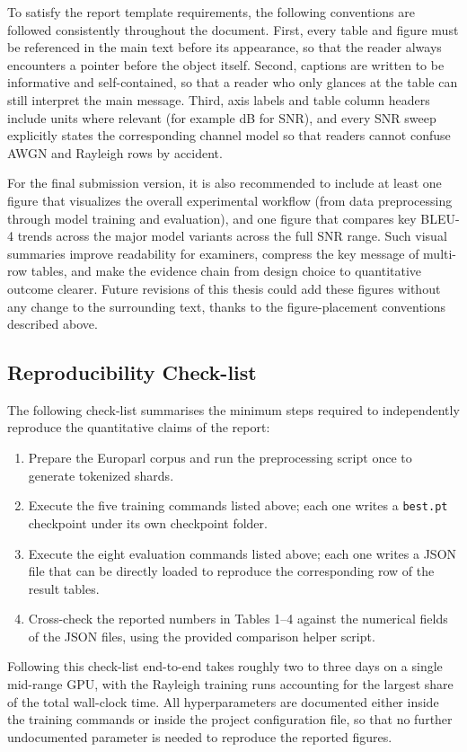 To satisfy the report template requirements, the following conventions are followed consistently throughout the document. First, every table and figure must be referenced in the main text before its appearance, so that the reader always encounters a pointer before the object itself. Second, captions are written to be informative and self-contained, so that a reader who only glances at the table can still interpret the main message. Third, axis labels and table column headers include units where relevant (for example \si{dB} for SNR), and every SNR sweep explicitly states the corresponding channel model so that readers cannot confuse AWGN and Rayleigh rows by accident.

For the final submission version, it is also recommended to include at least one figure that visualizes the overall experimental workflow (from data preprocessing through model training and evaluation), and one figure that compares key BLEU-4 trends across the major model variants across the full SNR range. Such visual summaries improve readability for examiners, compress the key message of multi-row tables, and make the evidence chain from design choice to quantitative outcome clearer. Future revisions of this thesis could add these figures without any change to the surrounding text, thanks to the figure-placement conventions described above.

\subsection{Reproducibility Check-list}

The following check-list summarises the minimum steps required to independently reproduce the quantitative claims of the report:
\begin{enumerate}
    \item Prepare the Europarl corpus and run the preprocessing script once to generate tokenized shards.
    \item Execute the five training commands listed above; each one writes a \texttt{best.pt} checkpoint under its own checkpoint folder.
    \item Execute the eight evaluation commands listed above; each one writes a JSON file that can be directly loaded to reproduce the corresponding row of the result tables.
    \item Cross-check the reported numbers in Tables 1--4 against the numerical fields of the JSON files, using the provided comparison helper script.
\end{enumerate}

Following this check-list end-to-end takes roughly two to three days on a single mid-range GPU, with the Rayleigh training runs accounting for the largest share of the total wall-clock time. All hyperparameters are documented either inside the training commands or inside the project configuration file, so that no further undocumented parameter is needed to reproduce the reported figures.
